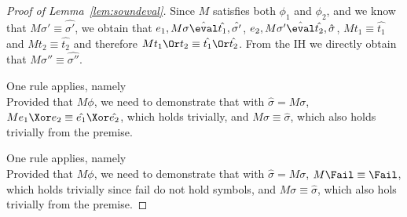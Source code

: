 \begin{proof}[Proof of Lemma~\ref{lem:soundeval}]
{  Since $M$ satisfies both $\phi_1$ and $\phi_2$, and we know that $M\sigma'\equiv \hat{\sigma'}$,
  we obtain that $e_1,M\sigma \hat{\eval}\hat{t_1},\hat{\sigma'}$,
  $e_2,M\sigma'\hat{\eval}\hat{t_2},\hat{\sigma}$, $M t_1\equiv \hat{t_1}$ and $M t_2 \equiv \hat{t_2}$ and therefore $M t_1\Or t_2 \equiv \hat{t_1}\Or\hat{t_2}$.
  From the IH we directly obtain that $M \sigma'' \equiv\hat{\sigma''}$.

  }

  {  One rule applies, namely \\
    Provided that $M\phi$, we need to demonstrate that  with $\hat{\sigma}=M\sigma$,
    $M e_1\Xor e_2 \equiv \hat{e_1}\Xor\hat{e_2}$,
    which holds trivially,
    and $M\sigma\equiv\hat{\sigma}$, which also holds trivially from the premise.

  }

  {  One rule applies, namely \\
    Provided that $M\phi$, we need to demonstrate that  with $\hat{\sigma}=M\sigma$,
    $M \Fail \equiv \Fail$, which holds trivially since fail do not hold symbols,
    and $M\sigma\equiv\hat{\sigma}$, which also hols trivially from the premise.

  }
\end{proof}



